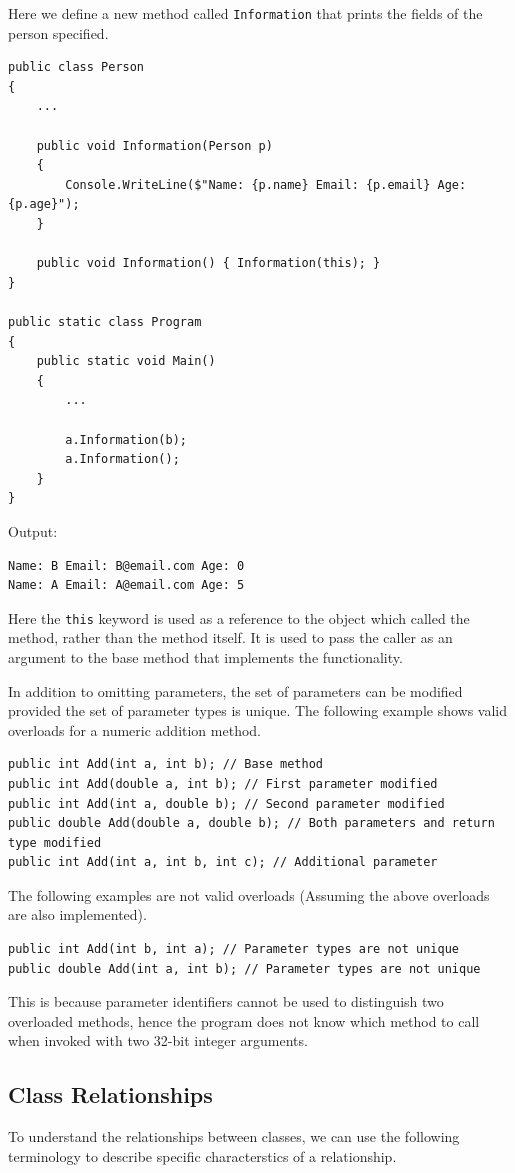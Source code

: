 \documentclass{article}
\begin{document}
Here we define a new method called
\lstinline{Information} that prints the fields of the person specified.
\begin{lstlisting}
public class Person
{
    ...

    public void Information(Person p)
    {
        Console.WriteLine($"Name: {p.name} Email: {p.email} Age: {p.age}");
    }

    public void Information() { Information(this); }
}

public static class Program
{
    public static void Main()
    {
        ...

        a.Information(b);
        a.Information();
    }
}
\end{lstlisting}
Output:
\begin{lstlisting}[numbers=none]
Name: B Email: B@email.com Age: 0
Name: A Email: A@email.com Age: 5
\end{lstlisting}
Here the \lstinline{this} keyword is used as a reference to the object which called the method, rather than the method itself.
It is used to pass the caller as an argument to the base method that implements the functionality.

In addition to omitting parameters, the set of parameters can be modified provided the set of parameter types
is unique. The following example shows valid overloads for a numeric addition method.
\begin{lstlisting}
public int Add(int a, int b); // Base method
public int Add(double a, int b); // First parameter modified
public int Add(int a, double b); // Second parameter modified
public double Add(double a, double b); // Both parameters and return type modified 
public int Add(int a, int b, int c); // Additional parameter
\end{lstlisting}
The following examples are not valid overloads (Assuming the above overloads are also implemented).
\begin{lstlisting}
public int Add(int b, int a); // Parameter types are not unique 
public double Add(int a, int b); // Parameter types are not unique 
\end{lstlisting}
This is because parameter identifiers cannot be used to distinguish two overloaded methods, 
hence the program does not know which method to call when invoked with two 32-bit integer arguments.
\subsection{Class Relationships}
To understand the relationships between classes, we can use the following terminology to describe specific
characterstics of a relationship.
\end{document}
